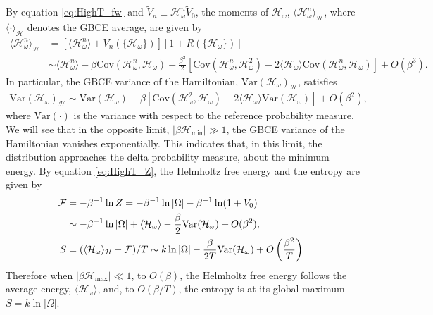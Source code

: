 \documentclass[english,12pt]{ttuthes}
\newcommand{\Hc}{\mathcal{H}}
\newcommand{\Fc}{\mathcal{F}}
\newcommand{\HM}{\mathcal{H}_{\text{max}}}
\newcommand{\Hm}{\mathcal{H}_{\text{min}}}
\begin{document}
By equation \eqref{eq:HighT_fw} and
$\tilde{V}_n\equiv\Hc_\omega^n\tilde{V}_0$, the moments of
$\Hc_\omega$, $\langle\Hc_\omega^n\rangle_{\Hc}$, where 
$\langle\cdot\rangle_{\Hc}$ denotes the GBCE average, are given by   
%
\begin{align*}
  \langle\Hc_\omega^n\rangle_{\Hc}&=[\langle\Hc_\omega^n\rangle+V_n(\{\Hc_\omega\})]
                            [1+R(\{\Hc_\omega\})]\\
      &\sim\langle\Hc_\omega^n\rangle-\beta\text{Cov}(\Hc_\omega^n,\Hc_\omega)
          +\frac{\beta^2}{2}[\text{Cov}(\Hc_\omega^n,\Hc_\omega^2)
           -2\langle\Hc_\omega\rangle\text{Cov}(\Hc_\omega^n,\Hc_\omega)]+O(\beta^3).
\end{align*}
%
In particular, the GBCE variance of the Hamiltonian,
$\text{Var}(\Hc_\omega)_{\Hc}$, satisfies 
%
\begin{align}
  \text{Var}(\Hc_\omega)_{\Hc}\sim\text{Var}(\Hc_\omega)-
    \beta[\text{Cov}(\Hc_\omega^2,\Hc_\omega)
        -2\langle\Hc_\omega\rangle\text{Var}(\Hc_\omega)]+O(\beta^2),      
\end{align}
%
where $\text{Var}(\cdot)$ is the variance with respect to the reference
probability measure. We will see that in the opposite limit, $|\beta\Hm|\gg1$,
the GBCE variance of the Hamiltonian vanishes
exponentially. This indicates that, in this limit, the distribution
approaches the delta probability measure, about the minimum energy. By equation
\eqref{eq:HighT_Z}, the Helmholtz free energy and the entropy are
given by    
%
\begin{align}
 \Fc&=-\beta^{-1}\ln{Z}
             =-\beta^{-1}\ln|\Omega|-\beta^{-1}\ln(1+V_0)\\
             &\sim-\beta^{-1}\ln|\Omega|+\langle\Hc_\omega\rangle
                -\frac{\beta}{2}\text{Var}(\Hc_\omega)+O(\beta^2),\notag\\
 S&=(\langle\Hc_\omega\rangle_{\Hc}-\Fc)/T
   \sim k\ln|\Omega|-\frac{\beta}{2T}\text{Var}(\Hc_\omega)
   +O\left(\frac{\beta^2}{T}\right).\notag
\end{align}
%
Therefore when $|\beta\HM|\ll1$, to $O(\beta)$, the Helmholtz free energy
follows the average energy, $\langle\Hc_\omega\rangle$, and, to $O(\beta/T)$, the
entropy is at its global maximum $S=k\ln|\Omega|$.
\end{document}
